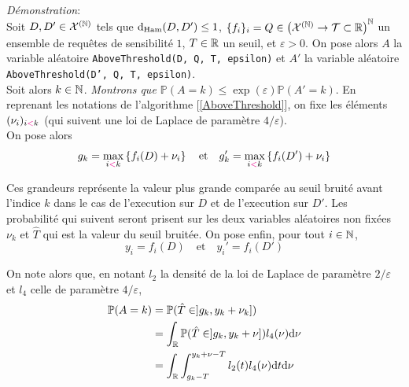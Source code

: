 \textit{Démonstration}:\\
Soit \(D, D' \in \mathcal X^{(\mathbb{N})}\) tels que \(\mathrm{d}_{\text{Ham}}(D,D') \leq 1\), \(\{f_i\}_i = Q \in \left( \mathcal X^{(\mathbb{N})} \to  \mathcal T \subset \mathbb{R} \right)^{\mathbb{N}}\) un ensemble de requêtes de sensibilité \(1\), \(T \in \mathbb{R}\) un seuil, et \(\varepsilon > 0\). On pose alors \(A\) la variable aléatoire \texttt{AboveThreshold(D, Q, T, epsilon)} et \(A'\) la variable aléatoire \texttt{AboveThreshold(D', Q, T, epsilon)}.\\

Soit alors \(k \in \mathbb{N}\). \textit{Montrons que \(\mathbb P (A = k) \leq \exp(\varepsilon)\mathbb P(A' = k)\)}. En reprenant les notations de l'algorithme [\ref{AboveThreshold}], on fixe les éléments \((\nu_i)_{i {\color{magenta} <} k}\) (qui suivent une loi de {\sc Laplace} de paramètre \(4/\varepsilon\)).\\


On pose alors
\[
    g_k = \max_{i {\color{magenta} <} k} \left\{ f_i(D) + \nu_i\right\} \quad \text{et} \quad g_k' = \max_{i {\color{magenta} <} k} \left\{ f_i(D') + \nu_i\right\}
\]

Ces grandeurs représente la valeur plus grande comparée au seuil bruité avant l'indice \(k\) dans le cas de l'execution sur \(D\) et de l'execution sur \(D'\). Les probabilité qui suivent seront prisent sur les deux variables aléatoires non fixées \(\nu_k\) et \(\hat T\) qui est la valeur du seuil bruitée. On pose enfin, pour tout \(i \in \mathbb{N}\),
\[
    y_i = f_i(D) \quad \text{et} \quad y_i' = f_i(D')
\]


On note alors que, en notant \(l_2\) la densité de la loi de {\sc Laplace} de paramètre \(2/\varepsilon\) et \(l_4\) celle de paramètre \(4/\varepsilon\),
\begin{align*}
    \mathbb P(A = k) & = \mathbb P(\hat T \in ]g_k, y_k + \nu_k])\\
    & = \int_{\mathbb{R}} \mathbb P(\hat T \in ]g_k, y_k + \nu])l_4(\nu) \mathrm{d} \nu \\
    & = \int_{\mathbb{R}}\int_{g_k - T}^{y_k + \nu - T} l_2(t)l_4(\nu) \mathrm{d} t \mathrm{d} \nu 
\end{align*}

